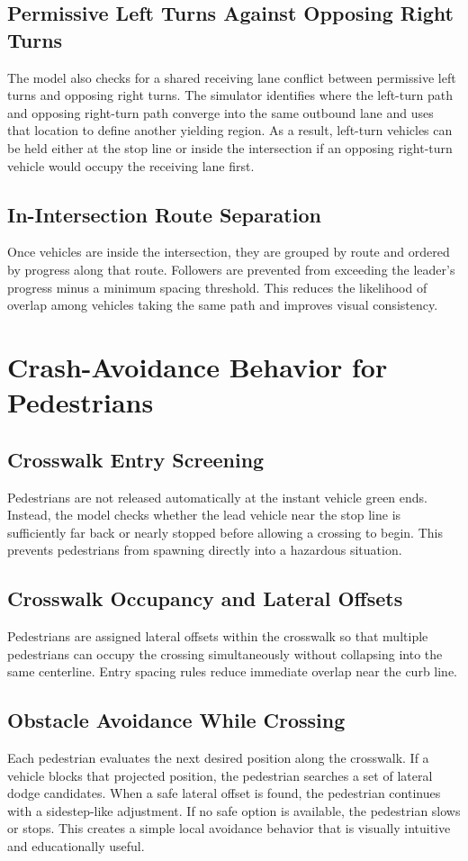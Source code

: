 \documentclass[conference]{IEEEtran}
\begin{document}
\subsection{Permissive Left Turns Against Opposing Right Turns}
The model also checks for a shared receiving lane conflict between permissive left turns and opposing right turns. The simulator identifies where the left-turn path and opposing right-turn path converge into the same outbound lane and uses that location to define another yielding region. As a result, left-turn vehicles can be held either at the stop line or inside the intersection if an opposing right-turn vehicle would occupy the receiving lane first.

\subsection{In-Intersection Route Separation}
Once vehicles are inside the intersection, they are grouped by route and ordered by progress along that route. Followers are prevented from exceeding the leader's progress minus a minimum spacing threshold. This reduces the likelihood of overlap among vehicles taking the same path and improves visual consistency.

\section{Crash-Avoidance Behavior for Pedestrians}
\subsection{Crosswalk Entry Screening}
Pedestrians are not released automatically at the instant vehicle green ends. Instead, the model checks whether the lead vehicle near the stop line is sufficiently far back or nearly stopped before allowing a crossing to begin. This prevents pedestrians from spawning directly into a hazardous situation.

\subsection{Crosswalk Occupancy and Lateral Offsets}
Pedestrians are assigned lateral offsets within the crosswalk so that multiple pedestrians can occupy the crossing simultaneously without collapsing into the same centerline. Entry spacing rules reduce immediate overlap near the curb line.

\subsection{Obstacle Avoidance While Crossing}
Each pedestrian evaluates the next desired position along the crosswalk. If a vehicle blocks that projected position, the pedestrian searches a set of lateral dodge candidates. When a safe lateral offset is found, the pedestrian continues with a sidestep-like adjustment. If no safe option is available, the pedestrian slows or stops. This creates a simple local avoidance behavior that is visually intuitive and educationally useful.
\end{document}
